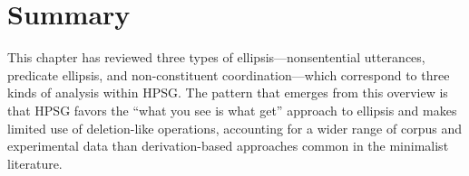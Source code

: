 %
%
%
%
%

%
%
%
%
%
%
%
%
%
%
%
%
%





\section{Summary}
\label{sum}
This chapter has reviewed three types of ellipsis---nonsentential utterances, predicate ellipsis, and non-constituent coordination---which correspond to three kinds of analysis within HPSG. The pattern that emerges from this overview is that HPSG favors the ``what you see is what get'' approach to ellipsis and makes limited use of deletion-like operations, %
 accounting for a wider range of corpus and experimental data %
 than derivation-based approaches common in the minimalist literature.











